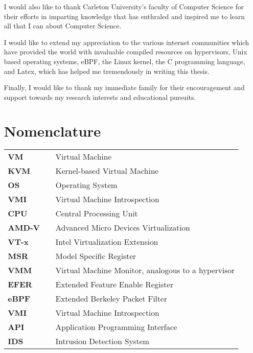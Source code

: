\documentclass{report}
\begin{document}
\begin{spacing}{1.5}
{\large I would also like to thank Carleton University's faculty of Computer Science for their efforts in imparting knowledge that has enthraled and inspired me to learn all that I can about Computer Science.}

{\large I would like to extend my appreciation to the various internet communities which have provided the world with invaluable compiled resources on hypervisors, Unix based operating systems, eBPF, the Linux kernel, the C programming language, and Latex, which has helped me tremendously in writing this thesis.}

{\large Finally, I would like to thank my immediate family for their encouragement and support towards my research interests and educational pursuits.}

\tableofcontents












\newpage
\chapter*{Nomenclature}

\begin{tabular}{lcl}
\large{\bf VM}  & & \large{Virtual Machine} \\
\large{\bf KVM}  & & \large{Kernel-based Virtual Machine} \\
\large{\bf OS}   & & \large{Operating System}        \\
\large{\bf VMI}  & & \large{Virtual Machine Introspection} \\
\large{\bf CPU}  & & \large{Central Processing Unit} \\
\large{\bf AMD-V}  & & \large{Advanced Micro Devices Virtualization} \\
\large{\bf VT-x}  & & \large{Intel Virtualization Extension} \\
\large{\bf MSR}  & & \large{Model Specific Register} \\
\large{\bf VMM}  & & \large{Virtual Machine Monitor, analogous to a hypervisor} \\
\large{\bf EFER}  & & \large{Extended Feature Enable Register} \\
\large{\bf eBPF}  & & \large{Extended Berkeley Packet Filter} \\
\large{\bf VMI}  & & \large{Virtual Machine Introspection} \\
\large{\bf API}  & & \large{Application Programming Interface} \\
\large{\bf IDS}  & & \large{Intrusion Detection System} \\
\end{tabular}















\end{spacing}
\end{document}
